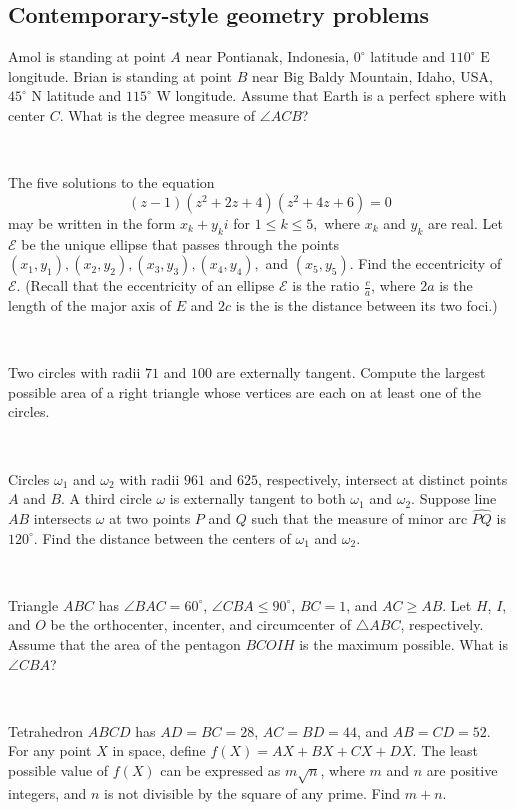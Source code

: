 \documentclass[mast]{lucky}
\begin{document}
\subsection{Contemporary-style geometry problems}
\begin{prob}[AMC 12B 2018/23]{3}
Amol is standing at point $A$ near Pontianak, Indonesia, $0^\circ$ latitude and $110^\circ \text{ E}$ longitude. Brian is standing at point $B$ near Big Baldy Mountain, Idaho, USA, $45^\circ \text{ N}$ latitude and $115^\circ \text{ W}$ longitude. Assume that Earth is a perfect sphere with center $C$. What is the degree measure of $\angle ACB$?
\end{prob}\\
\begin{prob}[AMC 12A 2021/21]{6}
The five solutions to the equation$$(z-1)(z^2+2z+4)(z^2+4z+6)=0$$may be written in the form $x_k+y_ki$ for $1\le k\le 5,$ where $x_k$ and $y_k$ are real. Let $\mathcal E$ be the unique ellipse that passes through the points $(x_1,y_1),(x_2,y_2),(x_3,y_3),(x_4,y_4),$ and $(x_5,y_5)$. Find the eccentricity of $\mathcal E$. (Recall that the eccentricity of an ellipse $\mathcal E$ is the ratio $\frac ca$, where $2a$ is the length of the major axis of $E$ and $2c$ is the is the distance between its two foci.)
\end{prob}\\
\begin{prob}[HMMT 2021 G8]{9}
Two circles with radii $71$ and $100$ are externally tangent. Compute the largest possible area of a right triangle whose vertices are each on at least one of the circles.
\end{prob}\\
\begin{req}[AIME I 2021/13]{9}
Circles $\omega_1$ and $\omega_2$ with radii $961$ and $625$, respectively, intersect at distinct points $A$ and $B$. A third circle $\omega$ is externally tangent to both $\omega_1$ and $\omega_2$. Suppose line $AB$ intersects $\omega$ at two points $P$ and $Q$ such that the measure of minor arc $\widehat{PQ}$ is $120^{\circ}$. Find the distance between the centers of $\omega_1$ and $\omega_2$.	
\end{req}\\
\begin{prob}[AMC 12B 2011/25]{13}
Triangle $ABC$ has $\angle BAC=60^\circ$, $\angle CBA \le 90^\circ$, $BC=1$, and $AC \ge AB$. Let $H$, $I$, and $O$ be the orthocenter, incenter, and circumcenter of $\triangle ABC$, respectively. Assume that the area of the pentagon $BCOIH$ is the maximum possible. What is $\angle CBA$?
\end{prob}\\
\begin{prob}[AIME II 2017/15]{13}
Tetrahedron $ABCD$ has $AD=BC=28$, $AC=BD=44$, and $AB=CD=52$. For any point $X$ in space, define $f(X)=AX+BX+CX+DX$. The least possible value of $f(X)$ can be expressed as $m\sqrt{n}$, where $m$ and $n$ are positive integers, and $n$ is not divisible by the square of any prime. Find $m+n$.	
\end{prob}
\end{document}
